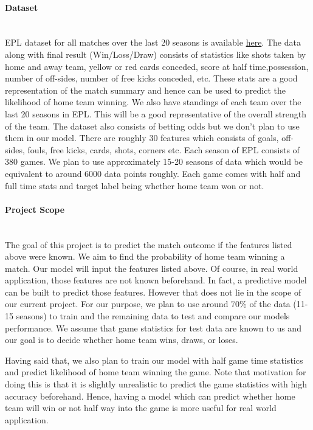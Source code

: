 \documentclass[11pt,letterpaper]{article}
\begin{document}
\paragraph{Dataset}\text{}\\
EPL dataset for all matches over the last 20 seasons is available 
\href{https://www.kaggle.com/saife245/english-premier-league}{here}. The data along with final result (Win/Loss/Draw) consists of statistics like shots taken by home and away team, yellow or red cards conceded, score at half time,possession, number of off-sides, number of free kicks conceded, etc. These stats are a good representation of the match summary and hence can be used to predict the likelihood of home team winning. We also have standings of each team over the last 20 seasons in EPL. This will be a good representative of the overall strength of the team. The dataset also consists of betting odds but we don't plan to use them in our model. There are roughly 30 features which consists of goals, off-sides, fouls, free kicks, cards, shots, corners etc. Each season of EPL consists of 380 games. We plan to use approximately 15-20 seasons of data which would be equivalent to around 6000 data points roughly. Each game comes with half and full time stats and target label being whether home team won or not.

\paragraph{Project Scope}\text{}\\
The goal of this project is to  predict the match outcome if the features listed above were known. We aim to find the probability of home team winning a match. Our model will input the features listed above. Of course, in real world application, those features are not known beforehand. In fact, a predictive model can be built to predict those features.  However that does not lie in the scope of our current project. For our purpose, we plan to use around 70\% of the data (11-15 seasons) to train and the remaining data to test and compare our models performance. We assume that game statistics for test data are known to us and our goal is to decide whether home team wins, draws, or loses.

Having said that, we also plan to train our model with half game time statistics and predict likelihood of home team winning the game. Note that motivation for doing this is that it is slightly unrealistic to predict the game statistics with high accuracy beforehand. Hence, having a model which can predict whether home team will win or not half way into the game is more useful for real world application.
\end{document}
